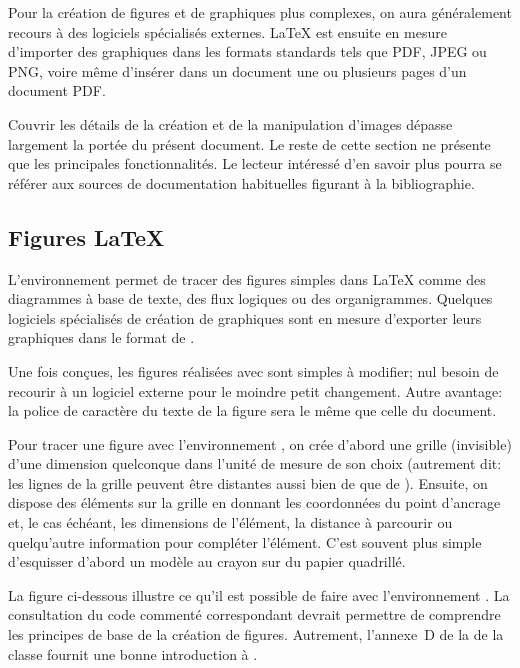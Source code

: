 Pour la création de figures et de graphiques plus complexes, on aura généralement
recours à des logiciels spécialisés externes. {\LaTeX} est ensuite en
mesure d'importer des graphiques dans les formats standards tels que PDF, JPEG
ou PNG, voire même d'insérer dans un document une ou plusieurs pages
d'un document PDF.

Couvrir les détails de la création et de la manipulation d'images
dépasse largement la portée du présent document. Le reste de cette
section ne présente que les principales fonctionnalités. Le lecteur
intéressé d'en savoir plus pourra se référer aux sources de documentation habituelles figurant à la
bibliographie.


\subsection{Figures {\LaTeX}}
\label{sec:tableaux:figures:picture}

L'environnement  permet de tracer des figures simples dans
{\LaTeX} comme des diagrammes à base de texte, des flux logiques ou
des organigrammes. Quelques logiciels spécialisés de création de
graphiques sont en mesure d'exporter leurs graphiques dans le format
de .

Une fois conçues, les figures réalisées avec  sont
simples à modifier; nul besoin de recourir à un logiciel externe pour
le moindre petit changement. Autre avantage: la police de caractère du texte
de la figure sera le même que celle du document.

Pour tracer une figure avec l'environnement , on crée
d'abord une grille (invisible) d'une dimension quelconque dans l'unité
de mesure de son choix (autrement dit: les lignes de la grille
peuvent être distantes aussi bien de \code{1pt} que de \code{1cm}).
Ensuite, on dispose des éléments sur la grille en donnant les
coordonnées du point d'ancrage et, le cas échéant, les dimensions de
l'élément, la distance à parcourir ou quelqu'autre information pour
compléter l'élément. C'est souvent plus simple d'esquisser d'abord un modèle au
crayon sur du papier quadrillé.

La figure ci-dessous illustre ce qu'il est possible de faire avec
l'environnement . La consultation du code commenté correspondant devrait
permettre de comprendre les principes de base de la création de
figures. Autrement, l'annexe~D de la %
de la classe  fournit une bonne introduction à .

